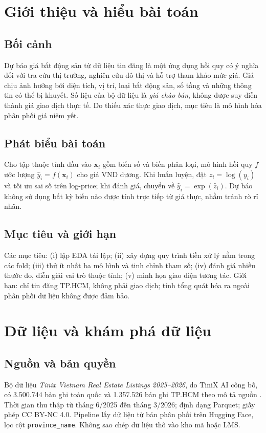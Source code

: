 \documentclass[12pt,a4paper]{report}
\begin{document}
\chapter{Giới thiệu và hiểu bài toán}
\section{Bối cảnh}
Dự báo giá bất động sản từ dữ liệu tin đăng là một ứng dụng hồi quy có ý nghĩa đối với tra cứu thị trường, nghiên cứu đô thị và hỗ trợ tham khảo mức giá. Giá chịu ảnh hưởng bởi diện tích, vị trí, loại bất động sản, số tầng và những thông tin có thể bị khuyết. Số liệu của bộ dữ liệu là \emph{giá chào bán}, không được suy diễn thành giá giao dịch thực tế. Do thiếu xác thực giao dịch, mục tiêu là mô hình hóa phân phối giá niêm yết.
\section{Phát biểu bài toán}
Cho tập thuộc tính đầu vào $\mathbf{x}_i$ gồm biến số và biến phân loại, mô hình hồi quy $f$ ước lượng $\hat y_i=f(\mathbf{x}_i)$ cho giá VND dương. Khi huấn luyện, đặt $z_i=\log(y_i)$ và tối ưu sai số trên log-price; khi đánh giá, chuyển về $\hat y_i=\exp(\hat z_i)$. Dự báo không sử dụng bất kỳ biến nào được tính trực tiếp từ giá thực, nhằm tránh rò rỉ nhãn.
\section{Mục tiêu và giới hạn}
Các mục tiêu: (i) lập EDA tái lập; (ii) xây dựng quy trình tiền xử lý nằm trong các fold; (iii) thử ít nhất ba mô hình và tinh chỉnh tham số; (iv) đánh giá nhiều thước đo, diễn giải vai trò thuộc tính; (v) minh họa giao diện tương tác. Giới hạn: chỉ tin đăng TP.HCM, không phải giao dịch; tính tổng quát hóa ra ngoài phân phối dữ liệu không được đảm bảo.
\chapter{Dữ liệu và khám phá dữ liệu}
\section{Nguồn và bản quyền}
Bộ dữ liệu \emph{Tinix Vietnam Real Estate Listings 2025--2026}, do TiniX AI công bố, có 3.500.744 bản ghi toàn quốc và 1.357.526 bản ghi TP.HCM theo mô tả nguồn \cite{dataset}. Thời gian thu thập từ tháng 6/2025 đến tháng 3/2026; định dạng Parquet; giấy phép CC BY-NC 4.0. Pipeline lấy dữ liệu từ bản phân phối trên Hugging Face, lọc cột \texttt{province\_name}. Không sao chép dữ liệu thô vào kho mã hoặc LMS.
\end{document}
